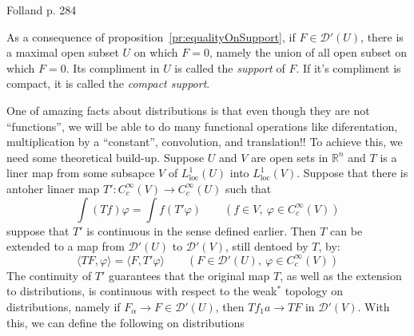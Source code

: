 \documentclass{book}
\newenvironment{Proof}[1][]
  {\begin{ProofTcb}[#1]}
  {\end{ProofTcb}}
\newcommand{\R}{{\mathbb{R}}}
\newcommand{\CD}{{\mathcal{D}}}
\renewcommand{\phi}{\varphi}
\newcommand{\rw}{\rightarrow}
\newcommand{\loc}{\operatorname{loc}}
\begin{document}
\begin{Proof}
	Folland p. 284
\end{Proof}


As a consequence of proposition~\ref{pr:equalityOnSupport}, if $F \in \CD'(U)$, there is a maximal open subset $U$ on
which $F = 0$, namely the union of all open subset on which $F = 0$. Its compliment in $U$ is called the \emph{support}
of $F$. If it's compliment is compact, it is called the \emph{compact support}.

One of amazing facts about distributions is that even though they are not ``functions'', we will be able to do many
functional operations like diferentation, multiplication by a ``constant'', convolution, and translation!! To achieve
this, we need some theoretical build-up. Suppose $U$ and $V$ are open sets in $\R^n$ and $T$ is a liner map from some
subsapce $V$ of $L_{\loc}^1(U)$ into $L_{\loc}^1(V)$. Suppose that there is antoher linaer map $T':
C_c^\infty(V) \rw C_c^\infty(U)$ such that
\[
	\int (Tf)\phi = \int f(T'\phi) \qquad (f \in V,\ \phi \in C_c^\infty(V))
\]
suppose that $T'$ is continuous in the sense defined earlier. Then $T$ can be extended to a map from $\CD'(U)$ to
$\CD'(V)$, still dentoed by $T$, by:
\[
	\langle TF,\phi\rangle = \langle F, T'\phi\rangle \qquad (F \in \CD'(U),\ \phi \in C_c^\infty(V))
\]
The continuity of $T'$ guarantees that the original map $T$, as well as the extension to distributions, is continuous
with respect to the weak$^*$ topology on distributions, namely if $F_\alpha \rw F \in \CD'(U)$, then $Tf_1a \rw TF$ in
$\CD'(V)$. With this, we can define the following on distributions
\end{document}
